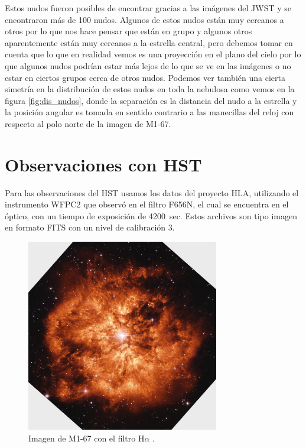 \documentclass{book}
\begin{document}
Estos nudos fueron posibles de encontrar gracias a las imágenes del JWST y se encontraron más de 100 nudos. Algunos de estos nudos están muy cercanos a otros por lo que nos hace pensar que están en grupo y algunos otros aparentemente están muy cercanos a la estrella central, pero debemos tomar en cuenta que lo que en realidad vemos es una proyección en el plano del cielo por lo que algunos nudos podrían estar más lejos de lo que se ve en las imágenes o no estar en ciertos grupos cerca de otros nudos. Podemos ver también una cierta simetría en la distribución de estos nudos en toda la nebulosa como vemos en la figura \ref{fig:dis_nudos}, donde la separación es la distancia del nudo a la estrella y la posición angular es tomada en sentido contrario a las manecillas del reloj con respecto al polo norte de la imagen de M1-67.

\section{Observaciones con HST}

Para las observaciones del HST usamos los datos del proyecto HLA, utilizando el instrumento WFPC2 que observó en el filtro F656N, el cual se encuentra en el óptico, con un tiempo de exposición de \SI{4200}{sec}. Estos archivos son tipo imagen en formato FITS con un nivel de calibración 3.

\begin{figure}[h]
    \centering
    \includegraphics[width=0.75\textwidth]{m1-67-comp-full-hst.jpg}
    \caption{Imagen de M1-67 con el filtro H$\alpha$ \citep{Grosdidier:1998}.}
    \label{fig:M1-67HST}
\end{figure}
\end{document}
